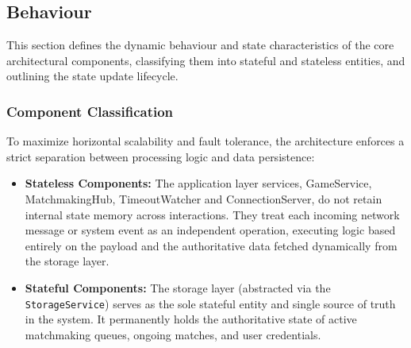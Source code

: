 \documentclass{scrartcl}
\begin{document}
\subsection{Behaviour}\label{behaviour}
This section defines the dynamic behaviour and state characteristics of the core architectural components, classifying them into stateful and stateless entities, and outlining the state update lifecycle.

\subsubsection*{Component Classification}
To maximize horizontal scalability and fault tolerance, the architecture enforces a strict separation between processing logic and data persistence:
\begin{itemize}
    \item \textbf{Stateless Components:} The application layer services, GameService, MatchmakingHub, TimeoutWatcher and ConnectionServer, do not retain internal state memory across interactions. They treat each incoming network message or system event as an independent operation, executing logic based entirely on the payload and the authoritative data fetched dynamically from the storage layer.
    \item \textbf{Stateful Components:} The storage layer (abstracted via the \texttt{StorageService}) serves as the sole stateful entity and single source of truth in the system. It permanently holds the authoritative state of active matchmaking queues, ongoing matches, and user credentials.
\end{itemize}
\end{document}
